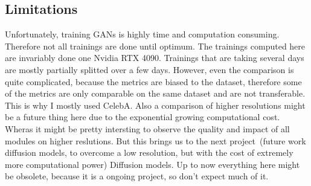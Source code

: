 \subsection{Limitations}
\label{sec:experiments_limitations}
Unfortunately, training GANs is highly time and computation consuming. Therefore not all trainings are done until optimum. The trainings computed here are invariably done one Nvidia RTX 4090. Trainings that are taking several days are mostly partially splitted over a few days. However, even the comparison is quite complicated, because the metrics are biased to the dataset, therefore some of the metrics are only comparable on the same dataset and are not transferable. This is why I mostly used CelebA. Also a comparison of higher resolutions might be a future thing here due to the exponential growing computational cost. Wheras it might be pretty intersting to observe the quality and impact of all modules on higher reslutions. But this brings us to the next project~(future work diffusion models, to overcome a low resolution, but with the cost of extremely more computational power) Diffusion models. Up to now everything here might be obsolete, because it is a ongoing project, so don't expect much of it. 